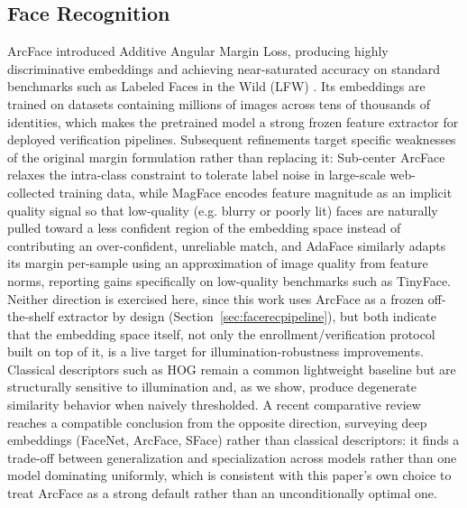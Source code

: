 \documentclass[conference]{IEEEtran}
\begin{document}
\subsection{Face Recognition}
ArcFace \cite{deng2019arcface} introduced Additive Angular Margin
Loss, producing highly discriminative embeddings and achieving
near-saturated accuracy on standard benchmarks such as Labeled
Faces in the Wild (LFW) \cite{lfw}. Its embeddings are trained on
datasets containing millions of images across tens of thousands
of identities, which makes the pretrained model a strong frozen
feature extractor for deployed verification pipelines.
Subsequent refinements target specific weaknesses of the
original margin formulation rather than replacing it: Sub-center
ArcFace \cite{subcenterarcface} relaxes the intra-class
constraint to tolerate label noise in large-scale web-collected
training data, while MagFace \cite{magface} encodes feature
magnitude as an implicit quality signal so that low-quality
(e.g. blurry or poorly lit) faces are naturally pulled toward a
less confident region of the embedding space instead of
contributing an over-confident, unreliable match, and AdaFace
\cite{adaface} similarly adapts its margin per-sample using an
approximation of image quality from feature norms, reporting
gains specifically on low-quality benchmarks such as TinyFace.
Neither
direction is exercised here, since this work uses ArcFace as a
frozen off-the-shelf extractor by design
(Section~\ref{sec:facerecpipeline}), but
both indicate that the embedding space itself, not only the
enrollment/verification protocol built on top of it, is a live
target for illumination-robustness improvements. Classical
descriptors such as HOG \cite{dalal2005} remain a common
lightweight baseline but are structurally sensitive to
illumination and, as we show, produce degenerate similarity
behavior when naively thresholded. A recent comparative review
\cite{robustfrsurvey2025} reaches a compatible conclusion from
the opposite direction, surveying deep embeddings (FaceNet,
ArcFace, SFace) rather than classical descriptors: it finds a
trade-off between generalization and specialization across
models rather than one model dominating uniformly, which is
consistent with this paper's own choice to treat ArcFace as a
strong default rather than an unconditionally optimal one.
\end{document}
